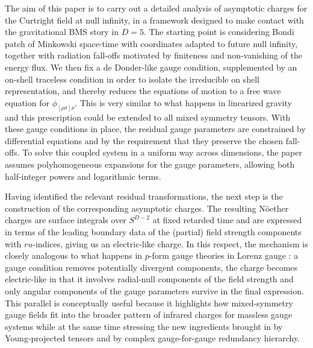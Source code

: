 \documentclass[a4paper,12pt]{article}
\begin{document}
The aim of this paper is to carry out a detailed analysis of asymptotic charges for the Curtright field at null infinity, in a framework designed to make contact with the gravitational BMS story in \( D = 5 \). The starting point is considering Bondi patch of Minkowski space-time with coordinates adapted to future null infinity, together with radiation fall-offs motivated by finiteness and non-vanishing of the energy flux. We then fix a de Donder-like gauge condition, supplemented by an on-shell traceless condition in order to isolate the irreducible on shell representation, and thereby reduces the equations of motion to a free wave equation for \( \phi_{[\rho\sigma]\nu} \). This is very similar to what happens in linearized gravity and this prescription could be extended to all mixed symmetry tensors. With these gauge conditions in place, the residual gauge parameters are constrained by differential equations and by the requirement that they preserve the chosen fall-offs. To solve this coupled system in a uniform way across dimensions, the paper assumes polyhomogeneous expansions for the gauge parameters, allowing both half-integer powers and logarithmic terms.

Having identified the relevant residual transformations, the next step is the construction of the corresponding asymptotic charges. The resulting N\"oether charges are surface integrals over \( S^{D-2} \) at fixed retarded time and are expressed in terms of the leading boundary data of the (partial) field strength components with \( ru \)-indices, giving us an electric-like charge. In this respect, the mechanism is closely analogous to what happens in \( p \)-form gauge theories in Lorenz gauge \cite{Manzoni:2024tow}: a gauge condition removes potentially divergent components, the charge becomes electric-like in that it involves radial-null components of the field strength and only angular components of the gauge parameters survive in the final expression. This parallel is conceptually useful because it highlights how mixed-symmetry gauge fields fit into the broader pattern of infrared charges for massless gauge systems while at the same time stressing the new ingredients brought in by Young-projected tensors and by complex gauge-for-gauge redundancy hierarchy.
\end{document}
